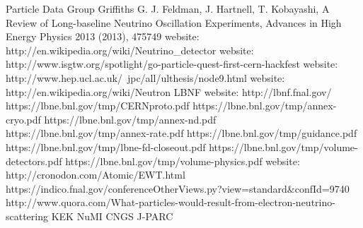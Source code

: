 \begin{thebibliography}{1}
    Particle Data Group
    Griffiths
    G. J. Feldman, J. Hartnell, T. Kobayashi, A Review of Long-baseline Neutrino Oscillation Experiments, Advances in High Energy Physics 2013 (2013), 475749
    website: http://en.wikipedia.org/wiki/Neutrino\_detector
    website: http://www.isgtw.org/spotlight/go-particle-quest-first-cern-hackfest
    website: http://www.hep.ucl.ac.uk/~jpc/all/ulthesis/node9.html
    website: http://en.wikipedia.org/wiki/Neutron
    LBNF website: http://lbnf.fnal.gov/
    https://lbne.bnl.gov/tmp/CERNproto.pdf
    https://lbne.bnl.gov/tmp/annex-cryo.pdf
    https://lbne.bnl.gov/tmp/annex-nd.pdf
    https://lbne.bnl.gov/tmp/annex-rate.pdf
    https://lbne.bnl.gov/tmp/guidance.pdf
    https://lbne.bnl.gov/tmp/lbne-fd-closeout.pdf
    https://lbne.bnl.gov/tmp/volume-detectors.pdf
    https://lbne.bnl.gov/tmp/volume-physics.pdf
    website: http://cronodon.com/Atomic/EWT.html
    https://indico.fnal.gov/conferenceOtherViews.py?view=standard\&confId=9740
   http://www.quora.com/What-particles-would-result-from-electron-neutrino-scattering
    KEK
    NuMI
    CNGS
    J-PARC
\end{thebibliography}
